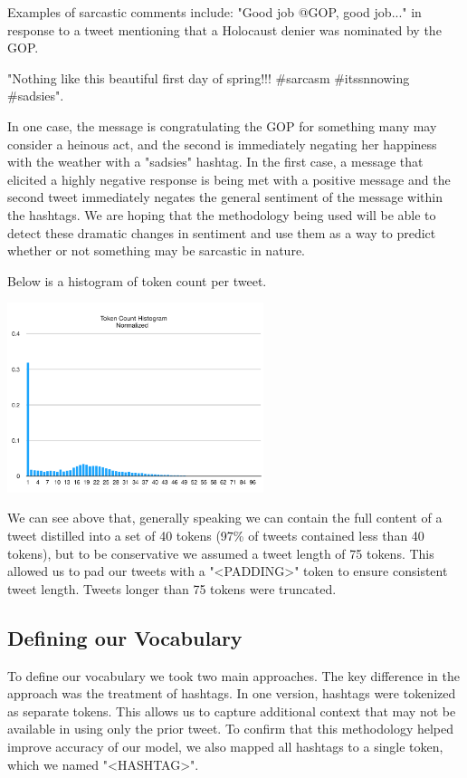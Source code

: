 \documentclass[11pt,a4paper]{article}
\begin{document}
Examples of sarcastic comments include:
 "Good job @GOP, good job..." in response to a tweet mentioning that a Holocaust denier was nominated by the GOP.   
 
 "Nothing like this beautiful first day of spring!!! \#sarcasm \#itssnnowing \#sadsies". 
 
 In one case, the message is congratulating the GOP for something many may consider a heinous act, and the second is immediately negating her happiness with the weather with a "sadsies" hashtag. In the first case, a message that elicited a highly negative response is being met with a positive message and the second tweet immediately negates the general sentiment of the message within the hashtags. We are hoping that the methodology being used will be able to detect these dramatic changes in sentiment and use them as a way to predict whether or not something may be sarcastic in nature.

Below is a histogram of token count per tweet.

\includegraphics[width=75mm,scale=0.5]{tokenhistogram.png}

We can see above that, generally speaking we can contain the full content of a tweet distilled into a set of 40 tokens (97\% of tweets contained less than 40 tokens), but to be conservative we assumed a tweet length of 75 tokens. This allowed us to pad our tweets with a "<PADDING>" token to ensure consistent tweet length. Tweets longer than 75 tokens were truncated.

\subsection{Defining our Vocabulary}

To define our vocabulary we took two main approaches. The key difference in the approach was the treatment of hashtags. In one version, hashtags were tokenized as separate tokens. This allows us to capture additional context that may not be available in using only the prior tweet. To confirm that this methodology helped improve accuracy of our model, we also mapped all hashtags to a single token, which we named "<HASHTAG>". 
\end{document}
